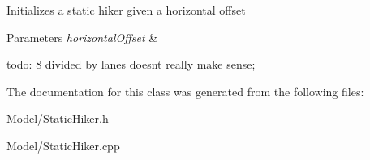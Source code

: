 Initializes a static hiker given a horizontal offset 
\begin{DoxyParams}{Parameters}
{\em horizontal\+Offset} & \\
\hline
\end{DoxyParams}
todo\+: 8 divided by lanes doesnt really make sense; 

The documentation for this class was generated from the following files\+:\begin{DoxyCompactItemize}
\item 
Model/Static\+Hiker.\+h\item 
Model/Static\+Hiker.\+cpp\end{DoxyCompactItemize}
